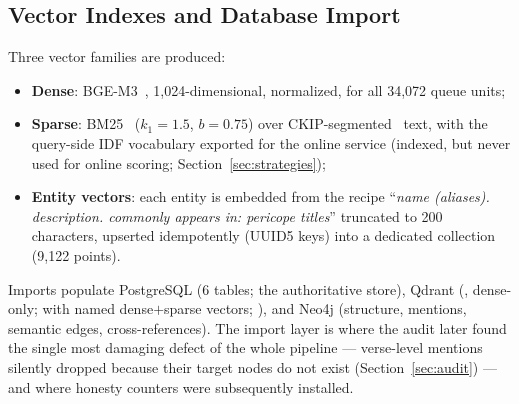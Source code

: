 \subsection{Vector Indexes and Database Import}
\label{sec:vectors}

Three vector families are produced:

\begin{itemize}
\item \textbf{Dense}: BGE-M3~\cite{chen2024bgem3}, 1{,}024-dimensional,
normalized, for all 34{,}072 queue units;
\item \textbf{Sparse}: BM25~\cite{robertson2009bm25} ($k_1{=}1.5$,
$b{=}0.75$) over CKIP-segmented~\cite{ckip} text, with the query-side IDF
vocabulary exported for the online service (indexed, but never used for
online scoring; Section~\ref{sec:strategies});
\item \textbf{Entity vectors}: each entity is embedded from the recipe
``\emph{name (aliases). description. commonly appears in: pericope
titles}'' truncated to 200 characters, upserted idempotently (UUID5 keys)
into a dedicated collection (9{,}122 points).
\end{itemize}

Imports populate PostgreSQL (6 tables; the authoritative store),
Qdrant (, dense-only;
 with named dense$+$sparse vectors;
), and Neo4j (structure, mentions, semantic edges,
cross-references). The import layer is where the audit later found the
single most damaging defect of the whole pipeline --- verse-level
mentions silently dropped because their target nodes do not exist
(Section~\ref{sec:audit}) --- and where honesty counters were
subsequently installed.
